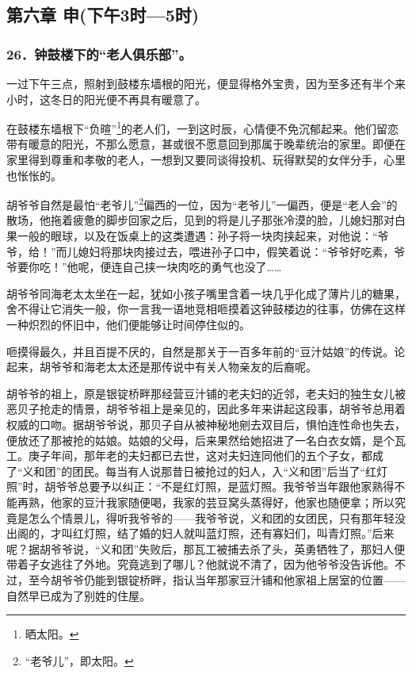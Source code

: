 \subsection*{第六章 申(下午3时—5时)}

\subsubsection*{26．钟鼓楼下的“老人俱乐部”。}
\par 一过下午三点，照射到鼓楼东墙根的阳光，便显得格外宝贵，因为至多还有半个来小时，这冬日的阳光便不再具有暖意了。
\par 在鼓楼东墙根下“负暄”\footnote{晒太阳。}的老人们，一到这时辰，心情便不免沉郁起来。他们留恋带有暖意的阳光，不那么愿意，甚或很不愿意回到那属于晚辈统治的家里。即便在家里得到尊重和孝敬的老人，一想到又要同谈得投机、玩得默契的女伴分手，心里也怅怅的。
\par 胡爷爷自然是最怕“老爷儿”\footnote{“老爷儿”，即太阳。}偏西的一位，因为“老爷儿”一偏西，便是“老人会”的散场，他拖着疲惫的脚步回家之后，见到的将是儿子那张冷漠的脸，儿媳妇那对白果一般的眼球，以及在饭桌上的这类遭遇：孙子将一块肉挟起来，对他说：“爷爷，给！”而儿媳妇将那块肉接过去，喂进孙子口中，假笑着说：“爷爷好吃素，爷爷要你吃！”他呢，便连自己挟一块肉吃的勇气也没了……
\par 胡爷爷同海老太太坐在一起，犹如小孩子嘴里含着一块几乎化成了薄片儿的糖果，舍不得让它消失一般，你一言我一语地竞相咂摸着这钟鼓楼边的往事，仿佛在这样一种炽烈的怀旧中，他们便能够让时间停住似的。
\par 咂摸得最久，并且百提不厌的，自然是那关于一百多年前的“豆汁姑娘”的传说。论起来，胡爷爷和海老太太还是那传说中有关人物亲友的后裔呢。
\par 胡爷爷的祖上，原是银锭桥畔那经营豆汁铺的老夫妇的近邻，老夫妇的独生女儿被恶贝子抢走的情景，胡爷爷祖上是亲见的，因此多年来讲起这段事，胡爷爷总用着权威的口吻。据胡爷爷说，那贝子自从被神秘地剜去双目后，惧怕连性命也失去，便放还了那被抢的姑娘。姑娘的父母，后来果然给她招进了一名白衣女婿，是个瓦工。庚子年间，那年老的夫妇都已去世，这对夫妇连同他们的五个子女，都成了“义和团”的团民。每当有人说那昔日被抢过的妇人，入“义和团”后当了“红灯照”时，胡爷爷总要予以纠正：“不是红灯照，是蓝灯照。我爷爷当年跟他家熟得不能再熟，他家的豆汁我家随便喝，我家的芸豆窝头蒸得好，他家也随便拿；所以究竟是怎么个情景儿，得听我爷爷的——我爷爷说，义和团的女团民，只有那年轻没出阁的，才叫红灯照，结了婚的妇人就叫蓝灯照，还有寡妇们，叫青灯照。”后来呢？据胡爷爷说，“义和团”失败后，那瓦工被捕去杀了头，英勇牺牲了，那妇人便带着子女逃往了外地。究竟逃到了哪儿？他就说不清了，因为他爷爷没告诉他。不过，至今胡爷爷仍能到银锭桥畔，指认当年那家豆汁铺和他家祖上居室的位置——自然早已成为了别姓的住屋。
